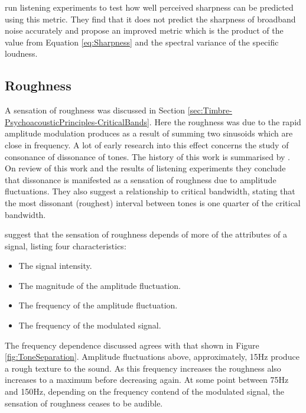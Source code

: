 		\citet{marui2006predicting} run listening experiments to test how well perceived sharpness can be predicted
		using this metric. They find that it does not predict the sharpness of broadband noise accurately and
		propose an improved metric which is the product of the value from Equation \ref{eq:Sharpness} and the
		spectral variance of the specific loudness.

	\subsection{Roughness}
	\label{sec:Timbre-TimbralFeatures-Roughness}
		A sensation of roughness was discussed in Section \ref{sec:Timbre-PsychoacousticPrinciples-CriticalBands}.
		Here the roughness was due to the rapid amplitude modulation produces as a result of summing two sinusoids
		which are close in frequency. A lot of early research into this effect concerns the study of consonance of
		dissonance of tones. The history of this work is summarised by \citet{plomp1965tonal}. On review of this
		work and the results of listening experiments they conclude that dissonance is manifested as a sensation of
		roughness due to amplitude fluctuations.  They also suggest a relationship to critical bandwidth, stating
		that the most dissonant (roughest) interval between tones is one quarter of the critical bandwidth.

		\citet{vassilakis2010psychoacoustic} suggest that the sensation of roughness depends of more of the
		attributes of a signal, listing four characteristics:

		\begin{itemize}
			\item The signal intensity.
			\item The magnitude of the amplitude fluctuation.
			\item The frequency of the amplitude fluctuation.
			\item The frequency of the modulated signal.
		\end{itemize}

		The frequency dependence discussed agrees with that shown in Figure \ref{fig:ToneSeparation}. Amplitude
		fluctuations above, approximately, 15Hz produce a rough texture to the sound. As this frequency increases
		the roughness also increases to a maximum before decreasing again. At some point between 75Hz and 150Hz,
		depending on the frequency contend of the modulated signal, the sensation of roughness ceases to be
		audible.

